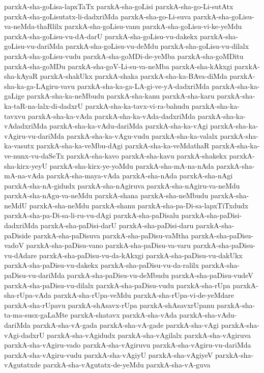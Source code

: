 {parxkA-sha-goLisa-lapxTaTx
parxkA-sha-goLisi
parxkA-sha-go-Li-sutAtx
parxkA-sha-goLisutatx-li-dadxriMda
parxkA-sha-go-Li-suva
parxkA-sha-goLisu-va-neMda-thaRlilx
parxkA-sha-goLisu-vanu
parxkA-sha-goLisu-vi-ke-yeMdu
parxkA-sha-goLisu-vu-dA-darU
parxkA-sha-goLisu-vu-dakekx
parxkA-sha-goLisu-vu-dariMda
parxkA-sha-goLisu-vu-deMdu
parxkA-sha-goLisu-vu-dilalx
parxkA-sha-goLisu-vudu
parxkA-sha-goMDi-de-yeMba
parxkA-sha-goMDitu
parxkA-sha-goMDu
parxkA-sha-goV-Li-su-va-neMba
parxkA-sha-kAkxgi
parxkA-sha-kAyaR
parxkA-shakUkx
parxkA-shaka
parxkA-sha-ka-BAva-diMda
parxkA-sha-ka-ga-LAgiru-vavu
parxkA-sha-ka-ga-LA-gi-ve-yA-dadxriMda
parxkA-sha-ka-gaLige
parxkA-sha-ka-neMbudu
parxkA-sha-kanu
parxkA-sha-karu
parxkA-sha-ka-taR-na-lalx-di-dadxrU
parxkA-sha-ka-tavx-vi-ra-bahudu
parxkA-sha-ka-tavxvu
parxkA-sha-ka-vAda
parxkA-sha-ka-vAda-dadxriMda
parxkA-sha-ka-vAdadxriMda
parxkA-sha-ka-vAdu-dariMda
parxkA-sha-ka-vAgi
parxkA-sha-ka-vAgiru-vu-dariMda
parxkA-sha-ka-vAgu-vudu
parxkA-sha-ka-valalx
parxkA-sha-ka-vasutx
parxkA-sha-ka-veMbu-dAgi
parxkA-sha-ka-veMdathaR
parxkA-sha-ka-ve-nunx-vu-daSeTx
parxkA-sha-kavo
parxkA-sha-kavu
parxkA-shakekx
parxkA-sha-kirx-yeyU
parxkA-sha-kirx-ye-yoMdu
parxkA-sha-mA-na-nAda
parxkA-sha-mA-na-vAda
parxkA-sha-maya-vAda
parxkA-sha-nAda
parxkA-sha-nAgi
parxkA-sha-nA-gidudx
parxkA-sha-nAgiruva
parxkA-sha-nAgiru-va-neMdu
parxkA-sha-nAgu-va-neMdu
parxkA-shana
parxkA-sha-neMbudu
parxkA-sha-neMdU
parxkA-sha-neMdu
parxkA-shanu
parxkA-sha-pa-Di-sa-lapxTiTxdudx
parxkA-sha-pa-Di-sa-li-ru-vu-dAgi
parxkA-sha-paDisalu
parxkA-sha-paDisi-dadxriMda
parxkA-sha-paDisi-darU
parxkA-sha-paDisi-daru
parxkA-sha-paDiside
parxkA-sha-paDisuva
parxkA-sha-paDisu-vaMtha
parxkA-sha-paDisu-vadoV
parxkA-sha-paDisu-vano
parxkA-sha-paDisu-va-varu
parxkA-sha-paDisu-vu-dAdare
parxkA-sha-paDisu-vu-da-kAkxgi
parxkA-sha-paDisu-vu-dakUkx
parxkA-sha-paDisu-vu-dakekx
parxkA-sha-paDisu-vu-da-ralilx
parxkA-sha-paDisu-vu-dariMda
parxkA-sha-paDisu-vu-deMbudu
parxkA-sha-paDisu-vudeV
parxkA-sha-paDisu-vu-dilalx
parxkA-sha-paDisu-vudu
parxkA-sha-rUpa
parxkA-sha-rUpa-vAda
parxkA-sha-rUpa-veMdu
parxkA-sha-rUpa-vi-de-yeMdare
parxkA-sha-rUpavu
parxkA-shAsavx-rUpa
parxkA-shAsavxrUpanu
parxkA-sha-ta-ma-susx-gaLaMte
parxkA-shatavx
parxkA-sha-vAda
parxkA-sha-vAdu-dariMda
parxkA-sha-vA-gada
parxkA-sha-vA-gade
parxkA-sha-vAgi
parxkA-sha-vAgi-dadxrU
parxkA-sha-vAgidudx
parxkA-sha-vAgilalx
parxkA-sha-vAgiruva
parxkA-sha-vAgiru-vado
parxkA-sha-vAgiruvu
parxkA-sha-vAgiru-vu-dariMda
parxkA-sha-vAgiru-vudu
parxkA-sha-vAgiyU
parxkA-sha-vAgiyeV
parxkA-sha-vAgutatxde
parxkA-sha-vAgutatx-de-yeMdu
parxkA-sha-vA-guva
}
